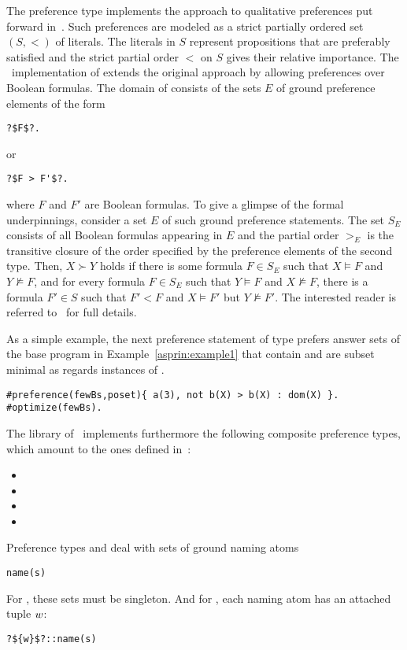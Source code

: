 The preference type  implements the approach to qualitative preferences put forward in~\cite{giumar12a}.
Such preferences are modeled as a strict partially ordered set
\(
(S,<)
\)
of literals.
The literals in $S$ represent propositions that are preferably satisfied
and the strict partial order $<$ on $S$ gives their relative importance.
%
The \asprin\ implementation of  extends the original approach by allowing preferences over Boolean formulas.
The domain of  consists of the sets $E$ of ground preference elements of the form
\begin{lstlisting}[numbers=none,escapechar=?]
?$F$?.
\end{lstlisting}
or 
\begin{lstlisting}[numbers=none,escapechar=?]
?$F > F'$?.
\end{lstlisting}
where $F$ and $F'$ are Boolean formulas.
%
To give a glimpse of the formal underpinnings,
consider a set $E$ of such ground preference statements.
The set $S_E$ consists of all Boolean formulas appearing in $E$
and the partial order $>_E$ is the transitive closure of the order 
specified by the preference elements of the second type. 
Then, $X \succ Y$ holds if 
there is some formula $F \in S_E$ such that $X \models F$ and $Y \not\models F$, 
and for every formula $F \in S_E$ such that $Y \models F$ and $X \not\models F$, 
there is a formula
$F'\in S$ such that $F'<F$ and $X \models F'$ but $Y \not\models F'$.
The interested reader is referred to~\cite{giumar12a} for full details.

As a simple example,
the next preference statement of type  prefers answer sets of the base program in Example~\ref{asprin:example1}
that contain  and are subset minimal as regards instances of .
\begin{lstlisting}[numbers=none]
#preference(fewBs,poset){ a(3), not b(X) > b(X) : dom(X) }.
#optimize(fewBs).
\end{lstlisting}

The library of \asprin\ implements furthermore the following composite preference types,
which amount to the ones defined in~\cite{sonpon06a}: 
\begin{itemize}
\item {}
\item {}
\item {}
\item {}
\end{itemize}
Preference types  and  deal with sets of ground naming atoms
\begin{lstlisting}[numbers=none,escapechar=?]
name(s)
\end{lstlisting}
For , these sets must be singleton.
And for , each naming atom has an attached tuple $\texttt{$w$}$: 
\begin{lstlisting}[numbers=none,escapechar=?]
?${w}$?::name(s)
\end{lstlisting}

